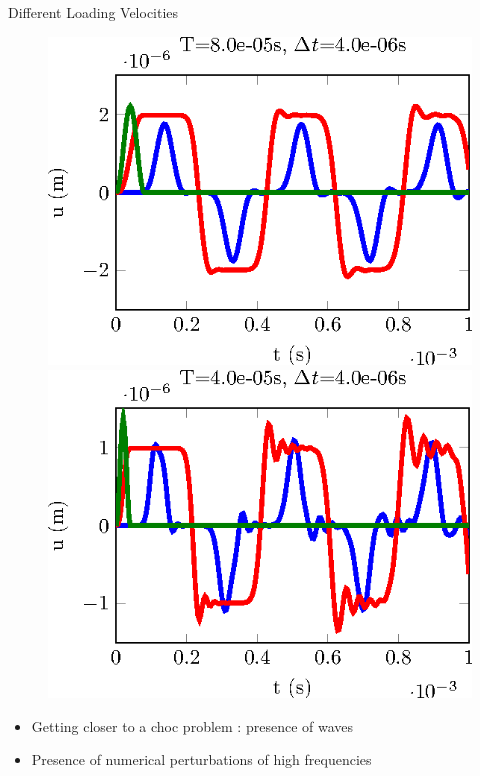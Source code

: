 \documentclass[12pt]{beamer}
\begin{document}
\begin{frame}{Different Loading Velocities}
\begin{figure}
\begin{minipage}{0.24\linewidth}
			\includegraphics[width=1\linewidth]{CalculSchem3-T2-tikz.eps}
		\end{minipage}
		\begin{minipage}{0.24\linewidth}
			\includegraphics[width=1\linewidth]{CalculSchem3-T1-tikz.eps}
		\end{minipage}
	\end{figure}
	\vspace{-0.6cm}
	\begin{itemize}
		\item Getting closer to a choc problem : presence of waves
			\vspace{-0.2cm}
		\item Presence of numerical perturbations of high frequencies
	\end{itemize}
	\vspace{-0.5cm}
	

\end{frame}
\end{document}
